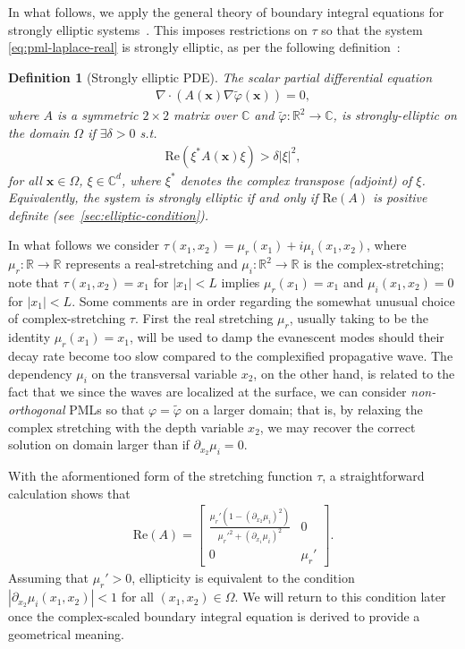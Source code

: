 \documentclass[11pt]{article}
\newcommand{\R}{\mathbb{R}}
\newcommand{\C}{\mathbb{C}}
\newcommand{\bx}{\mathbf{x}}
\newcommand{\tvarphi}{\tilde \varphi}
\newtheorem{definition}[theorem]{Definition}
\begin{document}
In what follows, we apply the general theory of boundary integral equations for
strongly elliptic systems~\cite{mclean2000strongly}. This imposes restrictions
on $\tau$ so that the system \cref{eq:pml-laplace-real} is strongly elliptic, as
per the following definition~\cite[equation 4.7]{mclean2000strongly}:
\begin{definition}[Strongly elliptic PDE]\label{def:strongly-elliptic}
  The scalar partial differential equation
  \begin{align}
    \nabla \cdot \left( A(\bx) \nabla \tvarphi(\bx) \right) = 0,
  \end{align}
  where $A$ is a symmetric $2 \times 2$ matrix over $\mathbb{C}$ and
  $\tvarphi : \R^2 \to \C$, is strongly-elliptic on the domain $\Omega$
  if $\exists \delta > 0$ s.t.
  \begin{align}
    \mathrm{Re}\left( \xi^* A(\bx) \xi \right) > \delta |\xi|^2,
  \end{align}
  for all $\bx \in \Omega$, $\xi \in \C^{d}$, where $\xi^*$ denotes the complex
  transpose (adjoint) of $\xi$. Equivalently, the system is strongly elliptic if
  and only if $\mathrm{Re}(A)$ is positive definite (see~\cref{sec:elliptic-condition}). 
\end{definition}

%

In what follows we consider $\tau(x_1,x_2) = \mu_r(x_1) + i \mu_i(x_1,x_2)$,
where $\mu_r : \R \to \R$ represents a real-stretching and $\mu_i : \R^2 \to \R$
is the complex-stretching; note that $\tau(x_1,x_2) = x_1$ for $|x_1|<L$ implies
$\mu_r(x_1) = x_1 $ and $\mu_i(x_1,x_2) = 0$ for $|x_1|<L$. Some comments are in
order regarding the somewhat unusual choice of complex-stretching $\tau$. First
the real stretching $\mu_r$, usually taking to be the identity $\mu_r(x_1) =
x_1$, will be used to damp the evanescent modes should their decay rate become
too slow compared to the complexified propagative wave. The dependency $\mu_i$
on the transversal variable $x_2$, on the other hand, is related to the fact
that we since the waves are localized at the surface, we can consider
\emph{non-orthogonal} PMLs so that $\varphi = \tvarphi$ on a larger domain; that
is, by relaxing the complex stretching with the depth variable $x_2$, we may
recover the correct solution on domain larger than if $\partial_{x_2} \mu_i =
0$. 

With the aformentioned form of the stretching function $\tau$, a straightforward
calculation shows that 
\begin{align}  
  \mathrm{Re}(A) = 
  \begin{bmatrix}
    \frac{\mu_r'(1-\left( \partial_{x_2}\mu_i \right)^2)}{\mu_r'^2 + \left( \partial_{x_1}\mu_i \right)^2} & 0 \\
    0 & \mu_r'
  \end{bmatrix}.
\end{align}
Assuming that $\mu_r' > 0$, ellipticity is equivalent to the condition
$|\partial_{x_2} \mu_i(x_1,x_2)| < 1$ for all $(x_1,x_2) \in \Omega$. We will
return to this condition later once the complex-scaled boundary integral
equation is derived to provide a geometrical meaning.
\end{document}

